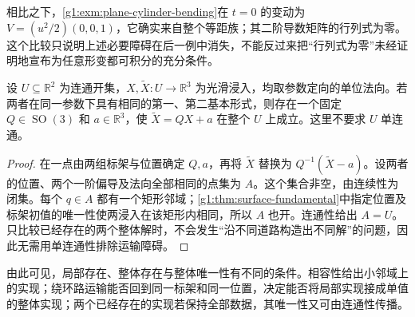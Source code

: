 相比之下，\cref{g1:exm:plane-cylinder-bending}在 \(t=0\) 的变动为 \(V=(u^2/2)(0,0,1)\)，它确实来自整个等距族；其二阶导数矩阵的行列式为零。这个比较只说明上述必要障碍在后一例中消失，不能反过来把“行列式为零”未经证明地宣布为任意形变都可积分的充分条件。

\begin{proposition}\label{g1:prop:surface-global-uniqueness}
	设 \(U\subseteq\mathbb R^2\) 为连通开集，\(X,\widetilde X:U\rightarrow\mathbb R^3\) 为光滑浸入，均取参数定向的单位法向。若两者在同一参数下具有相同的第一、第二基本形式，则存在一个固定 \(Q\in \operatorname{SO}(3)\) 和 \(a\in\mathbb R^3\)，使 \(\widetilde X=QX+a\) 在整个 \(U\) 上成立。这里不要求 \(U\) 单连通。
\end{proposition}

\begin{proof}
	在一点由两组标架与位置确定 \(Q,a\)，再将 \(\widetilde X\) 替换为 \(Q^{-1}(\widetilde X-a)\)。设两者的位置、两个一阶偏导及法向全部相同的点集为 \(A\)。这个集合非空，由连续性为闭集。每个 \(q\in A\) 都有一个矩形邻域；\cref{g1:thm:surface-fundamental}中指定位置及标架初值的唯一性使两浸入在该矩形内相同，所以 \(A\) 也开。连通性给出 \(A=U\)。只比较已经存在的两个整体解时，不会发生“沿不同道路构造出不同解”的问题，因此无需用单连通性排除运输障碍。
\end{proof}

由此可见，局部存在、整体存在与整体唯一性有不同的条件。相容性给出小邻域上的实现；绕环路运输能否回到同一标架和同一位置，决定能否将局部实现接成单值的整体实现；两个已经存在的实现若保持全部数据，其唯一性又可由连通性传播。
